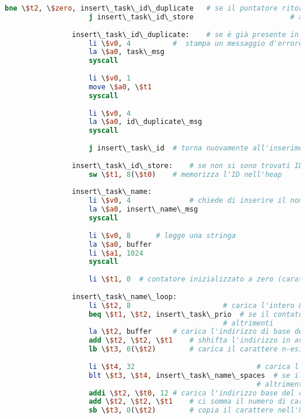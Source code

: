 \begin{center}
\begin{lstlisting}[language=mips, gobble=14, stepnumber=1]
                    bne \$t2, \$zero, insert\_task\_id\_duplicate	# se il puntatore ritornato da find\_id è non nullo, esiste già un task con l'ID inserito
                    j insert\_task\_id\_store						# altrimenti, può memorizzare l'ID tranquillamente
                    
                insert\_task\_id\_duplicate:	# se è già presente in coda un task con l'ID inserito
                    li \$v0, 4			#  stampa un messaggio d'errore
                    la \$a0, task\_msg
                    syscall
                    
                    li \$v0, 1
                    move \$a0, \$t1
                    syscall
                    
                    li \$v0, 4
                    la \$a0, id\_duplicate\_msg
                    syscall
                    
                    j insert\_task\_id	# torna nuovamente all'inserimento dell'ID
                    
                insert\_task\_id\_store:	# se non si sono trovati ID duplicati
                    sw \$t1, 8(\$t0)	# memorizza l'ID nell'heap
                    
                insert\_task\_name:
                    li \$v0, 4				# chiede di inserire il nome del task
                    la \$a0, insert\_name\_msg
                    syscall
                    
                    li \$v0, 8		# legge una stringa
                    la \$a0, buffer
                    li \$a1, 1024
                    syscall
                    
                    li \$t1, 0	# contatore inizializzato a zero (caratteri copiati nell'heap)
                    
                insert\_task\_name\_loop:
                    li \$t2, 8						# carica l'intero 8
                    beq \$t1, \$t2, insert\_task\_prio	# se il contatore ha raggiunto 8, salta all'inserimento della priorità
                									# altrimenti
                    la \$t2, buffer		# carica l'indirizzo di base della stringa inserita
                    add \$t2, \$t2, \$t1	# shhifta l'indirizzo in avanti del numero di caratteri già copiati (diciamo n)
                    lb \$t3, 0(\$t2)		# carica il carattere n-esimo della stringa
                	
                    li \$t4, 32								# carica l'intero 32 (primo carattere non speciale nella codifica ASCII)
                    blt \$t3, \$t4, insert\_task\_name\_spaces	# se il carattere letto è un carattere speciale, inizia il loop per inserire spazi
                											# altrimenti	
                    addi \$t2, \$t0, 12	# carica l'indirizzo base del campo nome del task (indirizzo base del record + 12 byte)
                    add \$t2, \$t2, \$t1	# ci somma il numero di caratteri letti (prima posizione del nome non copiata)
                    sb \$t3, 0(\$t2)		# copia il carattere nell'heap
                	

\end{lstlisting}
\end{center}

